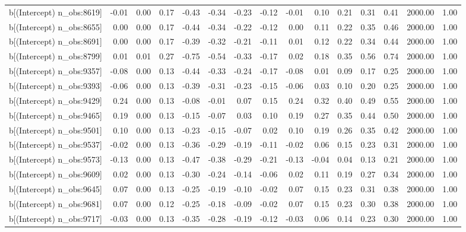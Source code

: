 \begin{table}[ht]
\begin{tabular}{rrrrrrrrrrrrrrr}
  b[(Intercept) n\_obs:8619] & -0.01 & 0.00 & 0.17 & -0.43 & -0.34 & -0.23 & -0.12 & -0.01 & 0.10 & 0.21 & 0.31 & 0.41 & 2000.00 & 1.00 \\ 
  b[(Intercept) n\_obs:8655] & 0.00 & 0.00 & 0.17 & -0.44 & -0.34 & -0.22 & -0.12 & 0.00 & 0.11 & 0.22 & 0.35 & 0.46 & 2000.00 & 1.00 \\ 
  b[(Intercept) n\_obs:8691] & 0.00 & 0.00 & 0.17 & -0.39 & -0.32 & -0.21 & -0.11 & 0.01 & 0.12 & 0.22 & 0.34 & 0.44 & 2000.00 & 1.00 \\ 
  b[(Intercept) n\_obs:8799] & 0.01 & 0.01 & 0.27 & -0.75 & -0.54 & -0.33 & -0.17 & 0.02 & 0.18 & 0.35 & 0.56 & 0.74 & 2000.00 & 1.00 \\ 
  b[(Intercept) n\_obs:9357] & -0.08 & 0.00 & 0.13 & -0.44 & -0.33 & -0.24 & -0.17 & -0.08 & 0.01 & 0.09 & 0.17 & 0.25 & 2000.00 & 1.00 \\ 
  b[(Intercept) n\_obs:9393] & -0.06 & 0.00 & 0.13 & -0.39 & -0.31 & -0.23 & -0.15 & -0.06 & 0.03 & 0.10 & 0.20 & 0.25 & 2000.00 & 1.00 \\ 
  b[(Intercept) n\_obs:9429] & 0.24 & 0.00 & 0.13 & -0.08 & -0.01 & 0.07 & 0.15 & 0.24 & 0.32 & 0.40 & 0.49 & 0.55 & 2000.00 & 1.00 \\ 
  b[(Intercept) n\_obs:9465] & 0.19 & 0.00 & 0.13 & -0.15 & -0.07 & 0.03 & 0.10 & 0.19 & 0.27 & 0.35 & 0.44 & 0.50 & 2000.00 & 1.00 \\ 
  b[(Intercept) n\_obs:9501] & 0.10 & 0.00 & 0.13 & -0.23 & -0.15 & -0.07 & 0.02 & 0.10 & 0.19 & 0.26 & 0.35 & 0.42 & 2000.00 & 1.00 \\ 
  b[(Intercept) n\_obs:9537] & -0.02 & 0.00 & 0.13 & -0.36 & -0.29 & -0.19 & -0.11 & -0.02 & 0.06 & 0.15 & 0.23 & 0.31 & 2000.00 & 1.00 \\ 
  b[(Intercept) n\_obs:9573] & -0.13 & 0.00 & 0.13 & -0.47 & -0.38 & -0.29 & -0.21 & -0.13 & -0.04 & 0.04 & 0.13 & 0.21 & 2000.00 & 1.00 \\ 
  b[(Intercept) n\_obs:9609] & 0.02 & 0.00 & 0.13 & -0.30 & -0.24 & -0.14 & -0.06 & 0.02 & 0.11 & 0.19 & 0.27 & 0.34 & 2000.00 & 1.00 \\ 
  b[(Intercept) n\_obs:9645] & 0.07 & 0.00 & 0.13 & -0.25 & -0.19 & -0.10 & -0.02 & 0.07 & 0.15 & 0.23 & 0.31 & 0.38 & 2000.00 & 1.00 \\ 
  b[(Intercept) n\_obs:9681] & 0.07 & 0.00 & 0.12 & -0.25 & -0.18 & -0.09 & -0.02 & 0.07 & 0.15 & 0.23 & 0.30 & 0.38 & 2000.00 & 1.00 \\ 
  b[(Intercept) n\_obs:9717] & -0.03 & 0.00 & 0.13 & -0.35 & -0.28 & -0.19 & -0.12 & -0.03 & 0.06 & 0.14 & 0.23 & 0.30 & 2000.00 & 1.00 \\ 

\end{tabular}
\end{table}
